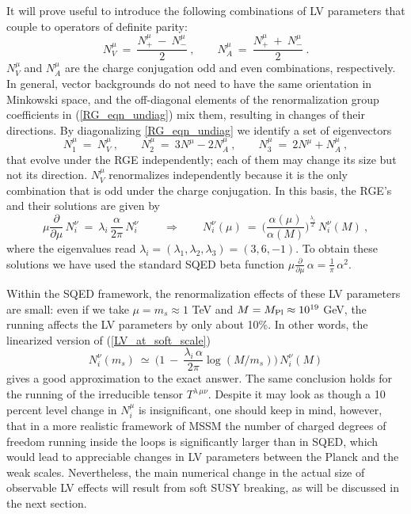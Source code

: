 \documentclass[12pt]{revtex4}
\begin{document}
It will prove useful to introduce the following combinations of 
LV parameters that couple to operators of definite parity:
\begin{equation}
\label{def_Nmu}
      N^\mu_V ~=~  \frac{ N_+^\mu ~-~ N_-^\mu }{2}~,   
\qquad 
      N^\mu_A ~=~  \frac{ N_+^\mu ~+~ N_-^\mu }{2}~.
\end{equation}
%
$N^\mu_V$ and $N^\mu_A$ are the charge conjugation odd and even
combinations, respectively. In general, vector backgrounds do not need
to have  the same orientation in Minkowski space, and the off-diagonal
elements of the renormalization group coefficients  in
(\ref{RG_eqn_undiag}) mix them, resulting in changes of their
directions.  By diagonalizing \eqref{RG_eqn_undiag} we identify a 
set of eigenvectors  
%
\begin{equation}
N_1^\mu ~=~ N^\mu_V~, 
\qquad 
N_2^\mu ~=~ 3 N^\mu - 2 N^\mu_A~,
\qquad 
N_3^\mu ~=~ 2 N^\mu + N^\mu_A~,
\end{equation} 
%
that evolve under the RGE independently; each of them may change its
size but not its direction. $N_V^\mu$ renormalizes independently
because it is the only combination that is odd under the charge
conjugation. 
In this basis, the RGE's and their solutions are given by 
\begin{equation} 
\mu \frac{\partial}{\partial\mu} \, N_i^\nu 
~=~ \lambda_i\, \frac { \alpha}{2 \pi} \, N_i^\nu~ 
\qquad \Rightarrow \qquad 
N_i^\nu(\mu) ~=~ 
\Big(  \frac {\alpha(\mu)}{\alpha(M)} \Big)^{\frac {\lambda_i}2} \, 
N_i^\nu(M)~, 
\label{LV_at_soft_scale}
\end{equation} 
where the eigenvalues read 
$\lambda_i = (\lambda_1, \lambda_2, \lambda_3) = (3, 6, -1)$. 
To obtain these solutions we have used the standard SQED beta function
\( 
\mu \frac{\partial}{\partial\mu} \, \alpha = \frac 1{\pi} \,
\alpha^2.  
\) 


Within the SQED framework, the renormalization effects of these LV
parameters are small: even if we take $\mu = m_{s} \approx 1$ TeV and
$M = M_{\rm Pl} \approx 10^{19}$ GeV, the running affects the LV
parameters by only about 10\%. In other words, the linearized version of
(\ref{LV_at_soft_scale})  
%
\begin{equation}
N_i^\nu(m_s) ~\simeq~ 
\Big(1~-~ \frac{\lambda_i\, \alpha}{2\pi}\log (M/m_s)
\Big)\, N_i^\nu(M)
\label{simplified}
\end{equation}
%
gives a good approximation to the exact answer. 
The same conclusion holds for the running of the
irreducible tensor $T^{\lambda\, \mu\nu}$. 
Despite it may look as though a 10 percent level change in $N_i^\mu$ is
insignificant, one should keep in mind, however, that in a more
realistic framework of MSSM the number of charged degrees of 
freedom running inside the loops is significantly larger than in SQED, 
which would lead to appreciable changes in LV parameters 
between the Planck and the weak scales. 
Nevertheless, the main numerical
change in the actual size of observable LV effects will result from
soft SUSY breaking, as will be discussed in the next section. 
\end{document}
